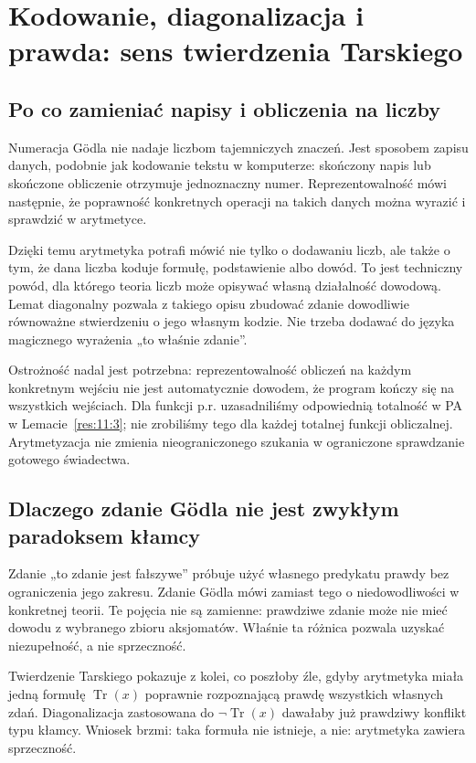\section{Kodowanie, diagonalizacja i prawda: sens twierdzenia Tarskiego}\label{sec:sens-tarski}
\subsection*{Po co zamieniać napisy i obliczenia na liczby}\label{sec:18:1}
Numeracja Gödla nie nadaje liczbom tajemniczych znaczeń. Jest sposobem zapisu danych, podobnie jak kodowanie tekstu w komputerze: skończony napis lub skończone obliczenie otrzymuje jednoznaczny numer. Reprezentowalność mówi następnie, że poprawność konkretnych operacji na takich danych można wyrazić i sprawdzić w arytmetyce.

Dzięki temu arytmetyka potrafi mówić nie tylko o dodawaniu liczb, ale także o tym, że dana liczba koduje formułę, podstawienie albo dowód. To jest techniczny powód, dla którego teoria liczb może opisywać własną działalność dowodową. Lemat diagonalny pozwala z takiego opisu zbudować zdanie dowodliwie równoważne stwierdzeniu o jego własnym kodzie. Nie trzeba dodawać do języka magicznego wyrażenia „to właśnie zdanie”.

Ostrożność nadal jest potrzebna: reprezentowalność obliczeń na każdym konkretnym wejściu nie jest automatycznie dowodem, że program kończy się na wszystkich wejściach. Dla funkcji p.r. uzasadniliśmy odpowiednią totalność w PA w Lemacie~\ref{res:11:3}; nie zrobiliśmy tego dla każdej totalnej funkcji obliczalnej. Arytmetyzacja nie zmienia nieograniczonego szukania w ograniczone sprawdzanie gotowego świadectwa.

\subsection*{Dlaczego zdanie Gödla nie jest zwykłym paradoksem kłamcy}\label{sec:18:2}
Zdanie „to zdanie jest fałszywe” próbuje użyć własnego predykatu prawdy bez ograniczenia jego zakresu. Zdanie Gödla mówi zamiast tego o niedowodliwości w konkretnej teorii. Te pojęcia nie są zamienne: prawdziwe zdanie może nie mieć dowodu z wybranego zbioru aksjomatów. Właśnie ta różnica pozwala uzyskać niezupełność, a nie sprzeczność.

Twierdzenie Tarskiego pokazuje z kolei, co poszłoby źle, gdyby arytmetyka miała jedną formułę $\operatorname{Tr}(x)$ poprawnie rozpoznającą prawdę wszystkich własnych zdań. Diagonalizacja zastosowana do $\neg\operatorname{Tr}(x)$ dawałaby już prawdziwy konflikt typu kłamcy. Wniosek brzmi: taka formuła nie istnieje, a nie: arytmetyka zawiera sprzeczność.

